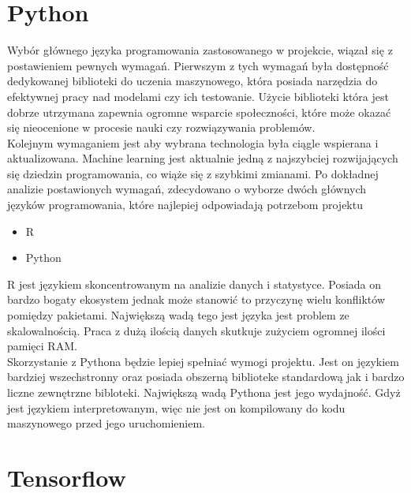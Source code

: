 \documentclass[a4paper,twoside,12pt]{book}
\begin{document}
\section{Python}
Wybór głównego języka programowania zastosowanego w projekcie, wiązał się z postawieniem pewnych wymagań. Pierwszym z tych wymagań była dostępność dedykowanej biblioteki do uczenia maszynowego, która posiada narzędzia do efektywnej pracy nad modelami czy ich testowanie. Użycie biblioteki która jest dobrze utrzymana zapewnia ogromne wsparcie społeczności, które może okazać się nieocenione w procesie nauki czy rozwiązywania problemów.\\Kolejnym wymaganiem jest aby wybrana technologia była ciągle wspierana i aktualizowana. Machine learning jest aktualnie jedną z najszybciej rozwijających się dziedzin programowania, co wiąże się z szybkimi zmianami. Po dokładnej analizie postawionych wymagań, zdecydowano o wyborze dwóch głównych języków programowania, które najlepiej odpowiadają potrzebom projektu
\begin{itemize}
  \item R
  \item Python
\end{itemize}

R jest językiem skoncentrowanym na analizie danych i statystyce. Posiada on bardzo bogaty ekosystem jednak może stanowić to przyczynę wielu konfliktów pomiędzy pakietami. Największą wadą tego jest języka jest problem ze skalowalnością. Praca z dużą ilością danych skutkuje zużyciem ogromnej ilości pamięci RAM.\\ Skorzystanie z Pythona będzie lepiej spełniać wymogi projektu. Jest on językiem bardziej wszechstronny oraz posiada obszerną biblioteke standardową jak i bardzo liczne zewnętrzne bibloteki. Największą wadą Pythona jest jego wydajność. Gdyż jest językiem interpretowanym, więc nie jest on kompilowany do kodu maszynowego przed jego uruchomieniem.
\section{Tensorflow}
\end{document}
